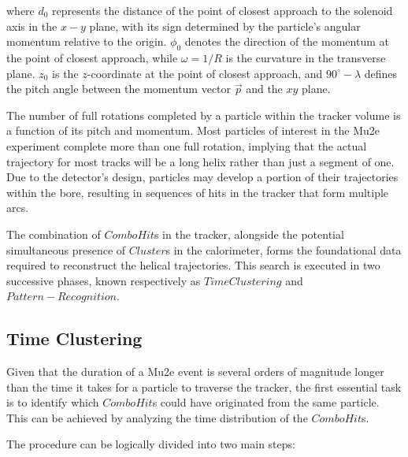 where $d_0$ represents the distance of the point of closest 
approach to the solenoid axis in the $x-y$ plane, with its 
sign determined by the particle's angular momentum relative 
to the origin. $\phi_0$ denotes the direction of the momentum 
at the point of closest approach, while $\omega = 1/R$ is the 
curvature in the transverse plane. $z_0$ is the $z$-coordinate 
at the point of closest approach, and $90^\circ - \lambda$ 
defines the pitch angle between the momentum vector $\vec{p}$ and the $xy$ plane.

The number of full rotations completed by a particle within 
the tracker volume is a function of its pitch and momentum. 
Most particles of interest in the Mu2e experiment complete 
more than one full rotation, implying that the actual trajectory 
for most tracks will be a long helix rather than just a segment 
of one. Due to the detector's design, particles may develop a 
portion of their trajectories within the bore, resulting in 
sequences of hits in the tracker that form multiple arcs.

The combination of $ComboHit$s in the tracker, alongside the 
potential simultaneous presence of $Cluster$s in the calorimeter, 
forms the foundational data required to reconstruct the helical 
trajectories. This search is executed in two successive phases, 
known respectively as $TimeClustering$ and $Pattern-Recognition$.
\subsection{Time Clustering}
Given that the duration of a Mu2e event is several orders of 
magnitude longer than the time it takes for a particle to 
traverse the tracker, the first essential task is to identify 
which $ComboHit$s could have originated from the same particle. 
This can be achieved by analyzing the time distribution of the $ComboHit$s.

The procedure can be logically divided into two main steps:

